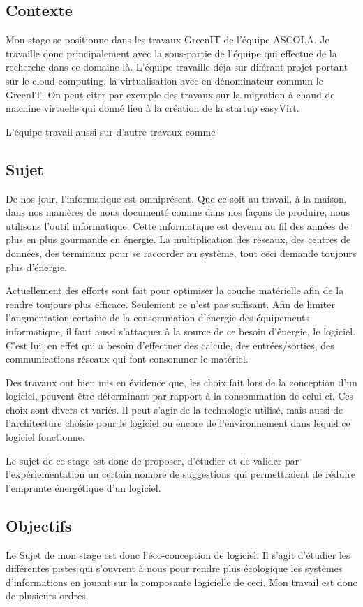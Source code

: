 \documentclass[a4paper, 11pt]{report}
\begin{document}
		\subsection{Contexte}
Mon stage se positionne dans les travaux GreenIT de l’équipe ASCOLA. Je travaille donc principalement avec la sous-partie de l'équipe qui effectue de la recherche dans ce domaine là. L'équipe travaille déja sur diférant projet portant sur le cloud computing, la virtualisation avec en dénominateur commun le GreenIT. On peut citer par exemple des travaux sur la migration à chaud de machine virtuelle qui donné lieu à la création de la startup easyVirt.

L'équipe travail aussi sur d'autre travaux comme %

		\subsection{Sujet}
De nos jour, l'informatique est omniprésent. Que ce soit au travail, à la maison, dans nos manières de nous documenté comme dans nos façons de produire, nous utilisons l'outil informatique. Cette informatique est devenu au fil des années de plus en plus gourmande en énergie. La multiplication des réseaux, des centres de données, des terminaux pour se raccorder au système, tout ceci demande toujours plus d'énergie.

Actuellement des efforts sont fait pour optimiser la couche matérielle afin de la rendre toujours plus efficace. Seulement ce n'est pas suffisant. Afin de limiter l'augmentation certaine de la consommation d'énergie des équipements informatique, il faut aussi s'attaquer à la source de ce besoin d'énergie, le logiciel. C'est lui, en effet qui a besoin d'effectuer des calcule, des entrées/sorties, des communications réseaux qui font consommer le matériel.

Des travaux ont bien mis en évidence que, les choix fait lors de la conception d'un logiciel, peuvent être déterminant par rapport à la consommation de celui ci. Ces choix sont divers et variés. Il peut s'agir de la technologie utilisé, mais aussi de l'architecture choisie pour le logiciel ou encore de l'environnement dans lequel ce logiciel fonctionne.

Le sujet de ce stage est donc de proposer, d'étudier et de valider par l'expériementation un certain nombre de suggestions qui permettraient de réduire l'emprunte énergétique d'un logiciel.

		\subsection{Objectifs}
Le Sujet de mon stage est donc l'éco-conception de logiciel. Il s'agit d'étudier les différentes pistes qui s'ouvrent à nous pour rendre plus écologique les systèmes d'informations en jouant sur la composante logicielle de ceci. Mon travail est donc de plusieurs ordres.
\end{document}
